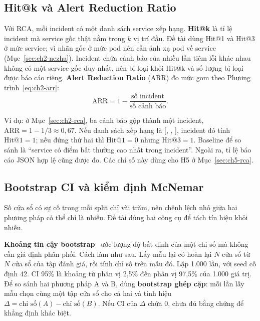 \subsection{Hit@k và Alert Reduction Ratio}
\label{sec:ch2-hitk}

Với RCA, mỗi incident có một danh sách service xếp hạng. \textbf{Hit@k} là tỉ lệ incident mà service gốc thật nằm trong $k$ vị trí đầu. Đề tài dùng Hit@1 và Hit@3 ở mức service; vì nhãn gốc ở mức pod nên cần ánh xạ pod về service (Mục~\ref{sec:ch2-nezha}). Incident chứa cảnh báo của nhiều lần tiêm lỗi khác nhau không có một service gốc duy nhất, nên bị loại khỏi Hit@k và số lượng bị loại được báo cáo riêng. \textbf{Alert Reduction Ratio} (ARR) đo mức gom theo Phương trình~\eqref{eq:ch2-arr}:
\begin{equation}
  \mathrm{ARR} = 1 - \frac{\text{số incident}}{\text{số cảnh báo}}.
  \label{eq:ch2-arr}
\end{equation}

Ví dụ: ở Mục~\ref{sec:ch2-rca}, ba cảnh báo gộp thành một incident, $\mathrm{ARR} = 1 - 1/3 \approx 0{,}67$. Nếu danh sách xếp hạng là [, , ], incident đó tính $\mathrm{Hit@1} = 1$; nếu  đứng thứ hai thì $\mathrm{Hit@1} = 0$ nhưng $\mathrm{Hit@3} = 1$. Baseline để so sánh là ``service có điểm bất thường cao nhất trong incident''. Ngoài ra, tỉ lệ báo cáo JSON hợp lệ cũng được đo. Các chỉ số này dùng cho H5 ở Mục~\ref{sec:ch5-rca}.

\subsection{Bootstrap CI và kiểm định McNemar}
\label{sec:ch2-thong-ke}

Số cửa sổ có sự cố trong mỗi split chỉ vài trăm, nên chênh lệch nhỏ giữa hai phương pháp có thể chỉ là nhiễu. Đề tài dùng hai công cụ để tách tín hiệu khỏi nhiễu.

\textbf{Khoảng tin cậy bootstrap}~\cite{efron1993bootstrap} ước lượng độ bất định của một chỉ số mà không cần giả định phân phối. Cách làm như sau. Lấy mẫu lại có hoàn lại $N$ cửa sổ từ $N$ cửa sổ của tập đánh giá, rồi tính chỉ số trên mẫu đó. Lặp 1.000 lần, với seed cố định 42. CI 95\% là khoảng từ phân vị 2,5\% đến phân vị 97,5\% của 1.000 giá trị. Để so sánh hai phương pháp A và B, dùng \textbf{bootstrap ghép cặp}: mỗi lần lấy mẫu chọn cùng một tập cửa sổ cho cả hai và tính hiệu $\Delta = \text{chỉ số}(A) - \text{chỉ số}(B)$. Nếu CI của $\Delta$ chứa 0, chưa đủ bằng chứng để khẳng định khác biệt.

